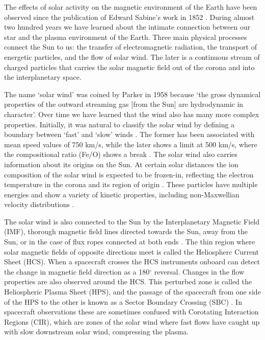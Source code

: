The effects of solar activity on the magnetic environment of the Earth have been observed since the publication of Edward Sabine's work in 1852 \citep{Sabine1852}. During almost two hundred years we have learned about the intimate connection between our star and the plasma environment of the Earth. Three main physical processes connect the Sun to us: the transfer of electromagnetic radiation, the transport of energetic particles, and the flow of solar wind. The later is a continuous stream of charged particles that carries the solar magnetic field out of the corona and into the interplanetary space.

The name `solar wind' was coined by Parker in 1958 because `the gross dynamical properties of the outward streaming gas [from the Sun] are hydrodynamic in character'\citep{Parker1958}. Over time we have learned that the wind also has many more complex properties. Initially, it was natural to classify the solar wind by defining a boundary between `fast' and `slow' winds \citep{Habbal1997}. The former has been associated with mean speed values of 750 km/s, while the later shows a limit at 500 km/s, where the compositional ratio (Fe/O) shows a break \citep{Feldman2005,Stakhiv2015}. The solar wind also carries information about its origins on the Sun. At certain solar distances the ion composition of the solar wind is expected to be frozen-in, reflecting the electron temperature in the corona and its region of origin \citep{Feldman2005,Zhao2009,Stakhiv2015}. These particles have multiple energies and show a variety of kinetic properties, including non-Maxwellian velocity distributions \citep{Pierrard2010,Matteini2012}.

The solar wind is also connected to the Sun by the Interplanetary Magnetic Field (IMF), thorough magnetic field lines directed towards the Sun, away from the Sun, or in the case of flux ropes connected at both ends \citep{Owens2016,Gosling2010}. The thin region where solar magnetic fields of opposite directions meet is called the Heliospherc Current Sheet (HCS). When a spacecraft crosses the HCS instruments onboard can detect the change in magnetic field direction as a 180$^\circ$ reversal. Changes in the flow properties are also observed around the HCS. This perturbed zone is called the Heliospheric Plasma Sheet (HPS), and the passage of the spacecraft from one side of the HPS to the other is known as a Sector Boundary Crossing (SBC) \citep{Winterhalter1994}. In spacecraft observations these are sometimes confused with Corotating Interaction Regions (CIR), which are zones of the solar wind where fast flows have caught up with slow downstream solar wind, compressing the plasma.

